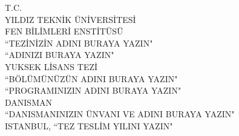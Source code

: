 \documentclass[12pt]{report}
\begin{document}
\shorthandoff{=} %
\shorthandon{=}
\begin{titlepage}
\begin{center}
\begin{singlespacing}
\uppercase{\large T.C.\\ YILDIZ TEKNİK ÜNİVERSİTESİ\\ FEN BİLİMLERİ ENSTİTÜSÜ}\\[4cm]
\uppercase{\large ``TEZİNİZİN ADINI BURAYA YAZIN"}\\[5cm]
\uppercase{\large ``ADINIZI BURAYA YAZIN"}\\[3cm]
\uppercase{\large YUKSEK LİSANS TEZİ\\ ``BÖLÜMÜNÜZÜN ADINI BURAYA YAZIN"\\ ``PROGRAMINIZIN ADINI BURAYA YAZIN"}\\[3cm] %
\uppercase{\large DANISMAN\\ ``DANISMANINIZIN ÜNVANI VE ADINI BURAYA YAZIN"}\\[2cm]
\uppercase{\large ISTANBUL, ``TEZ TESLİM YILINI YAZIN"}
\end{singlespacing}
\end{center}
\end{titlepage}
\restoregeometry
\end{document}
